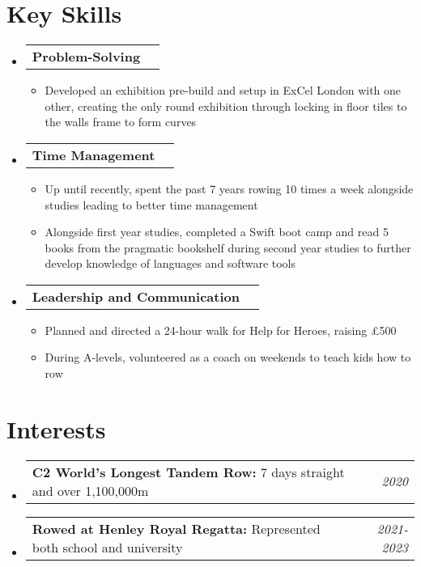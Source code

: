 \documentclass[a4paper,11pt]{article}
\makeatletter
\newcommand{\resumePOR}[3]{
\vspace{0.5mm}\item
    \begin{tabular*}{0.97\textwidth}[t]{l@{\extracolsep{\fill}}r}
        \textbf{#1}\hspace{0.3mm}#2 & \textit{\small{#3}} 
    \end{tabular*}
    \vspace{-2mm}
}
\newcommand{\resumeBasicSubheading}[1]{
\vspace{0.5mm}\item
    \begin{tabular*}{0.98\textwidth}[t]{l@{\extracolsep{\fill}}r}
        \textbf{#1}
    \end{tabular*}
    \vspace{-2.4mm}
}
\newcommand{\resumeSubHeadingListStart}{\begin{itemize}[leftmargin=*,labelsep=0mm]}
\newcommand{\resumeItemListStart}{\begin{justify}\begin{itemize}[leftmargin=3ex, rightmargin=2ex, noitemsep,labelsep=1.2mm,itemsep=0mm]\small}
\newcommand{\resumeSubHeadingListEnd}{\end{itemize}\vspace{2mm}}
\newcommand{\resumeItemListEnd}{\end{itemize}\end{justify}\vspace{-2mm}}
\makeatother
\begin{document}
\section{\textbf{Key Skills}}
\resumeSubHeadingListStart
   \resumeBasicSubheading
   {Problem-Solving}
   \resumeItemListStart
\item {Developed an exhibition pre-build and setup in ExCel London with one other,
       creating the only round exhibition through locking 
in floor tiles to the walls frame to form curves}
   \resumeItemListEnd
    \vspace{-2.0mm}
   \resumeBasicSubheading {Time Management}
   \resumeItemListStart
\item{Up until recently, spent the past 7 years rowing 10 times a week 
        alongside studies leading to better time management}
\item{Alongside first year studies, completed a Swift boot camp and read 
    5 books from the pragmatic bookshelf during second year studies to further
develop knowledge of languages and software tools}
   \resumeItemListEnd
    \vspace{-2.0mm}
    \resumeBasicSubheading{Leadership and Communication}
    \resumeItemListStart
\item{Planned and directed a 24-hour walk for Help for Heroes, raising £500}
\item{During A-levels, volunteered as a coach on weekends to teach kids how to row}
    \resumeItemListEnd
    \vspace{-2.0mm}
  \resumeSubHeadingListEnd
\vspace{-5.5mm}


\section{\textbf{Interests}}
\vspace{-0.4mm}
\resumeSubHeadingListStart
\resumePOR{C2 World's Longest Tandem Row: } %
    {7 days straight and over 1,100,000m} %
    {2020} %
    
\resumePOR{Rowed at Henley Royal Regatta: } %
    {Represented both school and university} %
    {2021-2023} %
\resumeSubHeadingListEnd
\vspace{-5mm}



\end{document}
